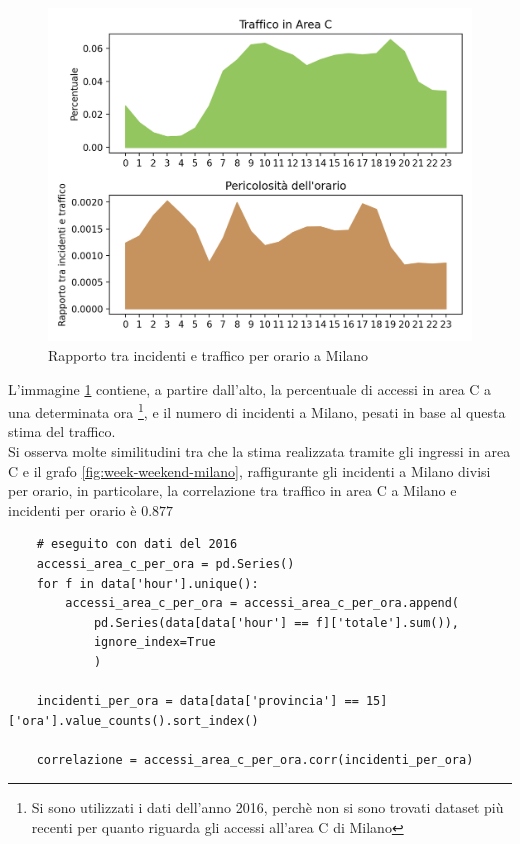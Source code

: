 \documentclass[a4paper]{report}
\begin{document}
\begin{figure}
    \includegraphics[width=\linewidth]{../src/area_c/rapporto_orario.png}
    \caption{Rapporto tra incidenti e traffico per orario a Milano}
    \label{fig:rapporto-incidenti-traffico}
\end{figure}

L'immagine \ref{fig:rapporto-incidenti-traffico} contiene, a partire dall'alto, 
la percentuale di accessi in area C a una determinata ora
\footnote{Si sono utilizzati i dati dell'anno 2016, perchè non si sono trovati dataset più recenti per 
quanto riguarda gli accessi all'area C di Milano}, 
e il numero di incidenti a Milano, pesati in base al questa stima del traffico.\\
Si osserva molte similitudini tra che la stima realizzata tramite gli ingressi in area C e 
il grafo \ref{fig:week-weekend-milano}, raffigurante gli incidenti a Milano divisi per orario, 
in particolare, la correlazione tra traffico in area C a Milano e incidenti per orario è $0.877$

\begin{lstlisting}
    # eseguito con dati del 2016
    accessi_area_c_per_ora = pd.Series()
    for f in data['hour'].unique():
        accessi_area_c_per_ora = accessi_area_c_per_ora.append(
            pd.Series(data[data['hour'] == f]['totale'].sum()), 
            ignore_index=True
            )

    incidenti_per_ora = data[data['provincia'] == 15]['ora'].value_counts().sort_index()

    correlazione = accessi_area_c_per_ora.corr(incidenti_per_ora)
\end{lstlisting}
\end{document}
